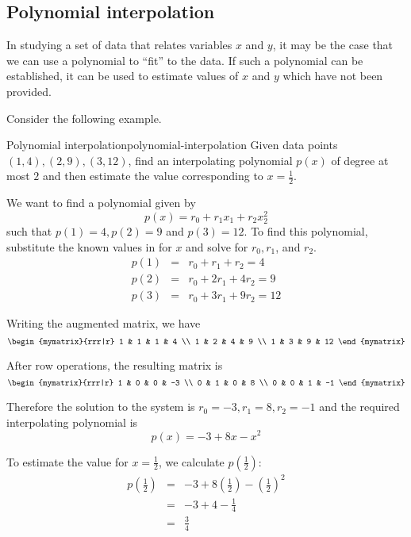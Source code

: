 \subsection{Polynomial interpolation}

In studying a set of data that relates variables $x$ and $y$, it may be the case that we can use a polynomial to ``fit'' to the data. If such a polynomial can be established, it can be used to estimate values of $x$ and $y$ which have not been provided. 

Consider the following example.

\begin{example}{Polynomial interpolation}{polynomial-interpolation}
Given data points $(1,4), (2,9), (3,12)$, find an interpolating polynomial $p(x)$ of degree at most $2$ and then estimate the value corresponding to $x = \frac{1}{2}$. 
\end{example}

\begin{solution}
We want to find a polynomial given by 
\[
p(x) = r_0 + r_1x_1 + r_2x_2^2
\]
such that $p(1)=4, p(2)=9$ and $p(3)=12$. 
To find this polynomial, substitute the known values in for $x$ and solve for $r_0, r_1$, and $r_2$. 
\begin{eqnarray*}
p(1) &=& r_0 + r_1 + r_2 = 4\\
p(2) &=& r_0 + 2r_1 + 4r_2 = 9\\
p(3) &=& r_0 + 3r_1 + 9r_2 = 12
\end{eqnarray*}

Writing the augmented matrix, we have
\[
\begin{mymatrix}{rrr|r}
1 & 1 & 1 & 4 \\
1 & 2 & 4 & 9  \\
1 & 3 & 9 & 12 
\end{mymatrix}
\]

After row operations, the resulting matrix is
\[
\begin{mymatrix}{rrr|r}
1 & 0 & 0 & -3 \\
0 & 1 & 0 & 8 \\
0 & 0 & 1 & -1 
\end{mymatrix}
\]

Therefore the solution to the system is $r_0 = -3, r_1 = 8, r_2 = -1$ and the required interpolating polynomial is 
\[
p(x) = -3 + 8x - x^2
\]

To estimate the value for $x = \frac{1}{2}$, we calculate $p(\frac{1}{2})$: 
\begin{eqnarray*}
p(\frac{1}{2}) &=& -3 + 8(\frac{1}{2}) - (\frac{1}{2})^2\\
&=& -3 + 4 - \frac{1}{4} \\
&=& \frac{3}{4}
\end{eqnarray*}
\end{solution}

